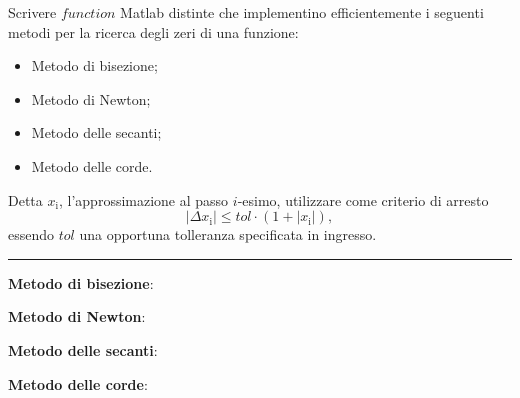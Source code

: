 Scrivere $function$ Matlab distinte che implementino efficientemente 
i seguenti metodi per la ricerca degli zeri di una funzione:
\begin{itemize}
	\item Metodo di bisezione;
	\item Metodo di Newton;
	\item Metodo delle secanti;
	\item Metodo delle corde.
\end{itemize}
Detta $x_\mathrm{i}$, l'approssimazione al passo $i$-esimo, utilizzare come criterio di arresto
$$|\Delta x_\mathrm{i}| \leq tol\cdot(1+|x_\mathrm{i}|),$$
essendo $tol$ una opportuna tolleranza specificata in ingresso.

\hspace*{\fill}
\par\noindent\rule{\textwidth}{0.4pt}
\hspace*{\fill}

\textbf{Metodo di bisezione}:

\textbf{Metodo di Newton}:

\textbf{Metodo delle secanti}:

\textbf{Metodo delle corde}:


